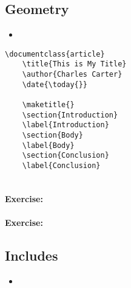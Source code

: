        \subsection{Geometry}
        \label{Geometry}
        
        \begin{framed}
            \begin{itemize}
                \item{}
            \end{itemize}
        \end{framed}


        \begin{verbatim}
\documentclass{article}
    \title{This is My Title}
    \author{Charles Carter}
    \date{\today{}}
 
    \maketitle{}
    \section{Introduction}
    \label{Introduction}
    \section{Body}
    \label{Body}
    \section{Conclusion}
    \label{Conclusion}
    
        \end{verbatim}

        \paragraph{Exercise:}

        \paragraph{Exercise:}


        \subsection{Includes}
        \label{Includes}
        
        \begin{framed}
            \begin{itemize}
                \item{}
            \end{itemize}
        \end{framed}


